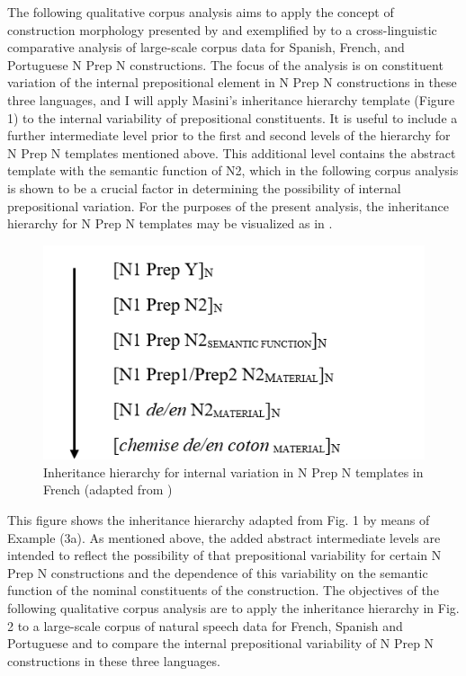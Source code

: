 \documentclass[output=paper]{langsci/langscibook}
\begin{document}
The following qualitative corpus analysis aims to apply the concept of construction morphology presented by \citet{Booij:2010,Booij:2015} and exemplified by \citet{Masini:2009} to a cross-linguistic comparative analysis of large-scale corpus data for Spanish, French, and Portuguese N Prep N constructions. The focus of the analysis is on constituent variation of the internal prepositional element in N Prep N constructions in these three languages, and I will apply Masini's inheritance hierarchy template (Figure 1) to the internal variability of prepositional constituents. It is useful to include a further intermediate level prior to the first and second levels of the hierarchy for N Prep N templates mentioned above. This additional level contains the abstract template with the semantic function of N2, which in the following corpus analysis is shown to be a crucial factor in determining the possibility of internal prepositional variation. For the purposes of the present analysis, the inheritance hierarchy for N Prep N templates may be visualized as in .

\begin{figure}
\caption{Inheritance hierarchy for internal variation in N Prep N templates in French (adapted from \citet{Masini:2009})\label{fig:henneke:Inheritancehierarchy}}
\includegraphics[scale=0.5]{figures/Inheritancehierarchy.png} 
\end{figure}

This figure shows the inheritance hierarchy adapted from Fig. 1 by means of Example (3a). As mentioned above, the added abstract intermediate levels are intended to reflect the possibility of that prepositional variability for certain N Prep N constructions and the dependence of this variability on the semantic function of the nominal constituents of the construction. The objectives of the following qualitative corpus analysis are to apply the inheritance hierarchy in Fig. 2 to a large-scale corpus of natural speech data for French, Spanish and Portuguese and to compare the internal prepositional variability of N Prep N constructions in these three languages.
\end{document}
